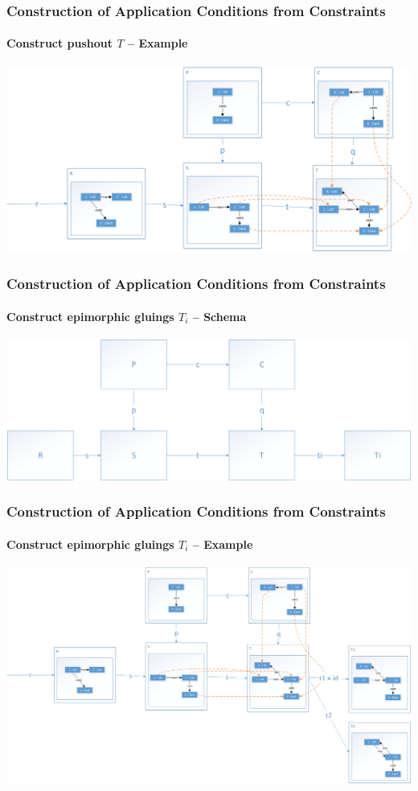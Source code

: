 \documentclass[32pt,t]{beamer}
\begin{document}
	\begin{frame}
		\frametitle{Construction of Application Conditions from Constraints}
		\framesubtitle{Construct pushout $T$ -- Example}
		\centering
		\includegraphics[width=\linewidth]{Images/21_Construct_T_Example}
	\end{frame}

	\begin{frame}
		\frametitle{Construction of Application Conditions from Constraints}
		\framesubtitle{Construct epimorphic gluings $T_i$ -- Schema}
		\centering
		\includegraphics[width=\linewidth]{Images/30_Construct_Tis_Schema}
	\end{frame}

	\begin{frame}
		\frametitle{Construction of Application Conditions from Constraints}
		\framesubtitle{Construct epimorphic gluings $T_i$ -- Example}
		\centering
		\includegraphics[height=.8\textheight]{Images/31_Construct_Tis_Example}
	\end{frame}
\end{document}
